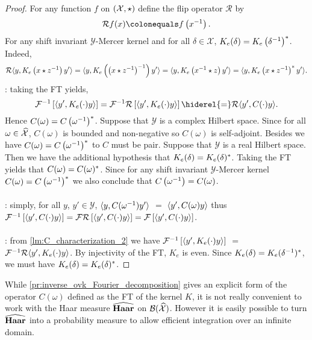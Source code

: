 \begin{proof}
For any function $f$ on $(\mathcal{X},\star)$ define the flip operator $\mathcal{R}$ by
\begin{dmath*}
\mathcal{R}f(x) \colonequals f\left(\inv{x}\right).
\end{dmath*}
For any shift invariant $\mathcal{Y}$-Mercer kernel and for all $\delta\in\mathcal{X}$,  $K_e(\delta)=K_e\left({\delta}^{-1}\right)^*$. Indeed,
\begin{dmath*}
\mathcal{R}\inner{y,K_e\left(x\groupop \inv{z}\right)y'}
=\inner{y,K_e\left(\inv{\left(x\groupop \inv{z}\right)}\right)y'}
=\inner{y,K_e\left(\inv{x}\groupop z\right)y'}
=\inner{y,K_e\left(x\groupop \inv{z}\right)^\adjoint y'}.
\end{dmath*}
: taking the \acl{FT} yields,
\begin{dmath*}
\IFT{\inner{y', K_e(\cdot)y}}=\mathcal{F}^{-1}\mathcal{R}\left[\inner{y', K_e(\cdot)y}\right]
\hiderel{=}\mathcal{R}\inner{y', C(\cdot)y}.
\end{dmath*}
Hence $C(\omega)=C\left({\omega}^{-1}\right)^*$. Suppose that $\mathcal{Y}$ is a complex Hilbert space. Since for all $\omega\in\mathcal{\widehat{X}}$, $C(\omega)$ is bounded and non-negative so $C(\omega)$ is self-adjoint. Besides we have $C(\omega)=C\left({\omega}^{-1}\right)^* $ to $C$ must be pair. Suppose that $\mathcal{Y}$ is a real Hilbert space. Then we have the additional hypothesis that $K_e(\delta)=K_e(\delta)^*$. Taking the \acl{FT} yields that $C(\omega)=C(\omega)^*$. Since for any shift invariant $\mathcal{Y}$-Mercer kernel $C(\omega)=C\left({\omega}^{-1}\right)^*$ we also conclude that $C\left({\omega}^{-1}\right)=C(\omega)$.
\paragraph{}
: simply, for all $y$, $y'\in\mathcal{Y}$, $\langle y, C({\omega}^{-1})y'\rangle$ $=$ $\langle y', C(\omega)y\rangle$ thus $\mathcal{F}^{-1}\left[\langle y', C(\cdot)y\rangle\right]=\mathcal{F}\mathcal{R}\left[\langle y', C(\cdot)y\rangle\right]=\mathcal{F}\left[\langle y', C(\cdot)y\rangle\right]$.
\paragraph{}
: from \cref{lm:C_characterization_2} we have $\mathcal{F}^{-1}\left[\langle y', K_e(\cdot)y\rangle\right]$ $=$ $\mathcal{F}^{-1}\mathcal{R}{\langle y', K_e(\cdot)y\rangle}$. By injectivity of the \acl{FT}, $K_e$ is even. Since $K_e(\delta)=K_e({\delta}^{-1})^* $, we must have $K_e(\delta)=K_e(\delta)^* $.
\end{proof}
While \cref{pr:inverse_ovk_Fourier_decomposition} gives an explicit form of the operator $C(\omega)$ defined as the \acl{FT} of the kernel $K$, it is not really convenient to work with the Haar measure $\widehat{\mathbf{Haar}}$ on $\mathcal{B}(\widehat{\mathcal{X}})$. However it is easily possible to turn $\widehat{\mathbf{Haar}}$ into a probability measure to allow efficient integration over an infinite domain.

